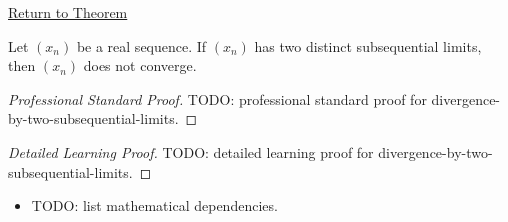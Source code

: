 \newpage
{}
\label{prf:divergence-by-two-subsequential-limits}

\begin{remark*}[Return]
\hyperref[thm:divergence-by-two-subsequential-limits]{Return to Theorem}
\end{remark*}

\begin{theorem*}
Let $(x_n)$ be a real sequence. If $(x_n)$ has two distinct subsequential
limits, then $(x_n)$ does not converge.

\smallskip
\noindent
\end{theorem*}

\begin{proof}[Professional Standard Proof]
\LRAProofBodyStart
TODO: professional standard proof for divergence-by-two-subsequential-limits.
\end{proof}

\begin{proof}[Detailed Learning Proof]
\LRAProofBodyStart
TODO: detailed learning proof for divergence-by-two-subsequential-limits.
\end{proof}

\begin{remark*}
\end{remark*}

\begin{dependencies}
\begin{itemize}
  \item TODO: list mathematical dependencies.
\end{itemize}
\end{dependencies}

\clearpage
